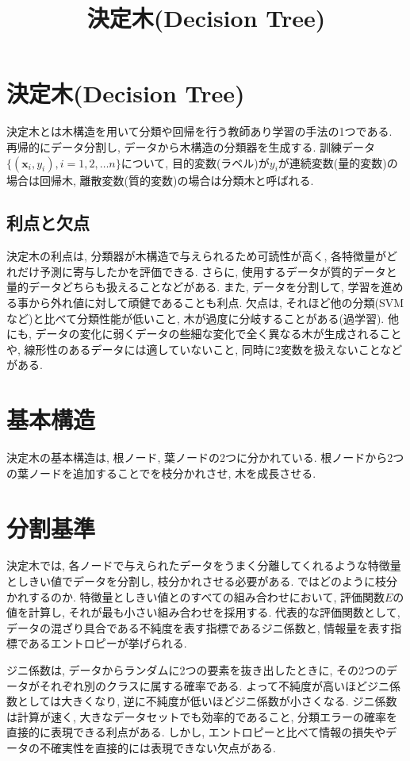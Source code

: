 \documentclass[dvipdfmx, 10pt]{jsarticle}
\title{\textbf{決定木(Decision Tree)}}
\author{}
\date{}
\begin{document}
\maketitle

\section*{決定木(Decision Tree)}
決定木とは木構造を用いて分類や回帰を行う教師あり学習の手法の1つである. 
再帰的にデータ分割し, データから木構造の分類器を生成する. 
訓練データ\(\{(\mathbf{x}_i, y_i), i=1, 2, \dots n\}\)について, 
目的変数(ラベル)が\(y_i\)が連続変数(量的変数)の場合は回帰木, 離散変数(質的変数)の場合は分類木と呼ばれる. 

\subsection*{利点と欠点}
決定木の利点は, 分類器が木構造で与えられるため可読性が高く, 各特徴量がどれだけ予測に寄与したかを評価できる. 
さらに, 使用するデータが質的データと量的データどちらも扱えることなどがある.  
また, データを分割して, 学習を進める事から外れ値に対して頑健であることも利点. 
欠点は, それほど他の分類(SVMなど)と比べて分類性能が低いこと, 木が過度に分岐することがある(過学習). 
他にも, データの変化に弱くデータの些細な変化で全く異なる木が生成されることや, 線形性のあるデータには適していないこと, 
同時に2変数を扱えないことなどがある. 

\section*{基本構造}
決定木の基本構造は, 根ノード, 葉ノードの2つに分かれている. 
根ノードから2つの葉ノードを追加することでを枝分かれさせ, 木を成長させる. 

\section*{分割基準}
決定木では, 各ノードで与えられたデータをうまく分離してくれるような特徴量としきい値でデータを分割し, 枝分かれさせる必要がある. 
ではどのように枝分かれするのか. 特徴量としきい値とのすべての組み合わせにおいて, 評価関数\(E\)の値を計算し, 
それが最も小さい組み合わせを採用する. 
代表的な評価関数として, データの混ざり具合である不純度を表す指標であるジニ係数と, 情報量を表す指標であるエントロピーが挙げられる. 

ジニ係数は, データからランダムに2つの要素を抜き出したときに, その2つのデータがそれぞれ別のクラスに属する確率である. 
よって不純度が高いほどジニ係数としては大きくなり, 逆に不純度が低いほどジニ係数が小さくなる. 
ジニ係数は計算が速く, 大きなデータセットでも効率的であること, 分類エラーの確率を直接的に表現できる利点がある. 
しかし, エントロピーと比べて情報の損失やデータの不確実性を直接的には表現できない欠点がある. 
\end{document}
